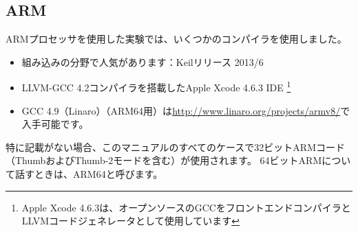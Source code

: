 \subsection{ARM}
\label{sec:hw_ARM}

\myindex{\idevices}
ARMプロセッサを使用した実験では、いくつかのコンパイラを使用しました。

\begin{itemize}
\item 組み込みの分野で人気があります：Keilリリース 2013/6

\item LLVM-GCC 4.2コンパイラを搭載したApple Xcode 4.6.3 IDE
\footnote{Apple Xcode 4.6.3は、オープンソースのGCCをフロントエンドコンパイラとLLVMコードジェネレータとして使用しています}

\item GCC 4.9（Linaro）（ARM64用）は\url{http://www.linaro.org/projects/armv8/}で入手可能です。

\end{itemize}

特に記載がない場合、このマニュアルのすべてのケースで32ビットARMコード（ThumbおよびThumb-2モードを含む）が使用されます。 
64ビットARMについて話すときは、ARM64と呼びます。







